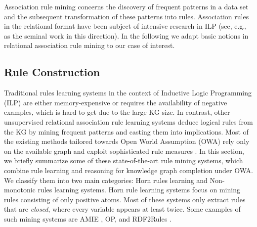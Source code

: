 Association rule mining concerns the discovery of frequent patterns in a data set and the subsequent transformation of these patterns into rules. Association rules in the relational format have been subject of intensive research in ILP (see, e.g., \cite{DBLP:conf/ilp/DehaspeR97} as the seminal work in this direction). In the following we adapt basic notions in relational association rule mining to our case of interest.

\subsection{Rule Construction}
Traditional rules learning systems in the context of Inductive Logic Programming (ILP) \cite{probfoil,DBLP:conf/ijcai/RaedtDTBV15,DBLP:conf/clima/CorapiSIR11} are either memory-expensive or requires the availability of negative examples, which is hard to get due to the large KG size. In contrast, other unsupervised relational 
association rule learning systems deduce logical rules from the KG by mining frequent patterns and casting them into implications. Most of the  existing methods tailored towards Open World Assumption (OWA) rely only on the available graph and exploit sophisticated rule measures \cite{amie,op,rumis}.
In this section, we briefly summarize some of these state-of-the-art rule mining systems, which combine rule learning and reasoning for knowledge graph completion under OWA. We classify them into two main categories: Horn rules learning and Non-monotonic rules learning systems.
Horn rule learning systems focus on mining rules consisting of only positive atoms. Most of these systems only extract rules that are \emph{closed}, where every variable appears at least twice. Some examples of such mining systems are AMIE \cite{amie}, OP, \cite{op} and RDF2Rules \cite{rdf2rules}.
